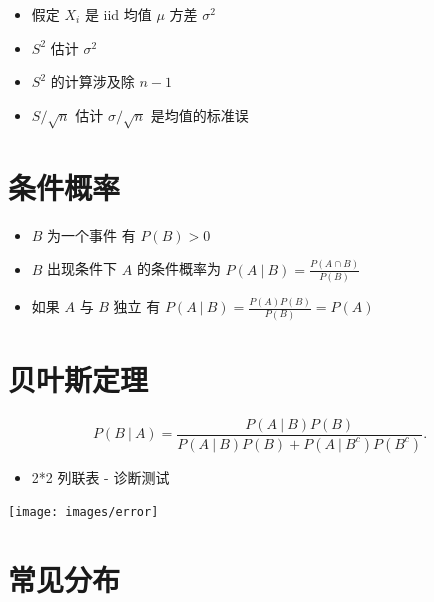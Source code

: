 \documentclass[
]{book}
\providecommand{\tightlist}{%
  \setlength{\itemsep}{0pt}\setlength{\parskip}{0pt}}
\begin{document}
\begin{itemize}
  \begin{itemize}
  \tightlist
  \item
    假定 \(X_i\) 是 iid 均值 \(\mu\) 方差 \(\sigma^2\)
  \item
    \(S^2\) 估计 \(\sigma^2\)
  \item
    \(S^2\) 的计算涉及除 \(n-1\)
  \item
    \(S / \sqrt{n}\) 估计 \(\sigma / \sqrt{n}\) 是均值的标准误
  \end{itemize}
\end{itemize}

\hypertarget{ux6761ux4ef6ux6982ux7387}{%
\section{条件概率}\label{ux6761ux4ef6ux6982ux7387}}

\begin{itemize}
\tightlist
\item
  \(B\) 为一个事件 有 \(P(B) > 0\)
\item
  \(B\) 出现条件下 \(A\) 的条件概率为 \(P(A ~|~ B) = \frac{P(A \cap B)}{P(B)}\)
\item
  如果 \(A\) 与 \(B\) 独立 有 \(P(A ~|~ B) = \frac{P(A) P(B)}{P(B)} = P(A)\)
\end{itemize}

\hypertarget{ux8d1dux53f6ux65afux5b9aux7406}{%
\section{贝叶斯定理}\label{ux8d1dux53f6ux65afux5b9aux7406}}

\[
P(B ~|~ A) = \frac{P(A ~|~ B) P(B)}{P(A ~|~ B) P(B) + P(A ~|~ B^c)P(B^c)}.
\]

\begin{itemize}
\tightlist
\item
  2*2 列联表 - 诊断测试
\end{itemize}

\texttt{[image: images/error]}

\hypertarget{ux5e38ux89c1ux5206ux5e03}{%
\section{常见分布}\label{ux5e38ux89c1ux5206ux5e03}}
\end{document}
